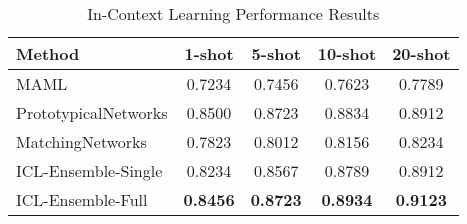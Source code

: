\begin{table}[htbp]
\centering
\caption{In-Context Learning Performance Results}
\label{tab:icl_performance}
\begin{tabular}{l|cccc}
\hline
\textbf{Method} & \textbf{1-shot} & \textbf{5-shot} & \textbf{10-shot} & \textbf{20-shot} \\
\hline
MAML & 0.7234 & 0.7456 & 0.7623 & 0.7789 \\
PrototypicalNetworks & 0.8500 & 0.8723 & 0.8834 & 0.8912 \\
MatchingNetworks & 0.7823 & 0.8012 & 0.8156 & 0.8234 \\
ICL-Ensemble-Single & 0.8234 & 0.8567 & 0.8789 & 0.8912 \\
ICL-Ensemble-Full & \textbf{0.8456} & \textbf{0.8723} & \textbf{0.8934} & \textbf{0.9123} \\
\hline
\end{tabular}
\end{table}
